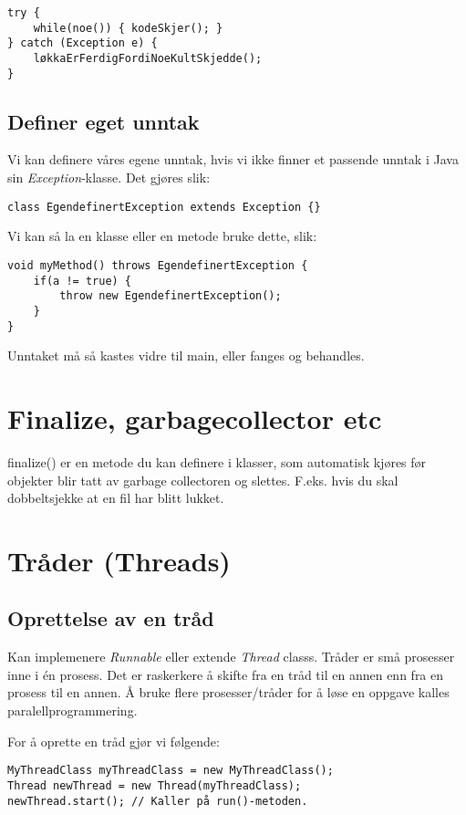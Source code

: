 \documentclass[11pt]{article}
\begin{document}
\begin{verbatim}
try { 
    while(noe()) { kodeSkjer(); }
} catch (Exception e) {
    løkkaErFerdigFordiNoeKultSkjedde();
}
\end{verbatim}
\subsection{Definer eget unntak}
\label{sec-16-3}

Vi kan definere våres egene unntak, hvis vi ikke finner et passende
unntak i Java sin \emph{Exception}-klasse. Det gjøres slik:


\begin{verbatim}
class EgendefinertException extends Exception {}
\end{verbatim}

Vi kan så la en klasse eller en metode bruke dette, slik:


\begin{verbatim}
void myMethod() throws EgendefinertException {
    if(a != true) {
        throw new EgendefinertException();
    }
}
\end{verbatim}

Unntaket må så kastes vidre til main, eller fanges og behandles. 
\section{Finalize, garbagecollector etc}
\label{sec-17}

finalize() er en metode du kan definere i klasser, som automatisk
kjøres før objekter blir tatt av garbage collectoren og
slettes. F.eks. hvis du skal dobbeltsjekke at en fil har blitt lukket.
\section{Tråder (Threads)}
\label{sec-18}
\subsection{Oprettelse av en tråd}
\label{sec-18-1}

Kan implemenere \emph{Runnable} eller extende \emph{Thread} classs.
Tråder er små prosesser inne i én prosess. Det er raskerkere å 
skifte fra en tråd til en annen enn fra en prosess til en annen.
Å bruke flere prosesser/tråder for å løse en oppgave kalles
paralellprogrammering.

For å oprette en tråd gjør vi følgende:


\begin{verbatim}
MyThreadClass myThreadClass = new MyThreadClass();
Thread newThread = new Thread(myThreadClass);
newThread.start(); // Kaller på run()-metoden.
\end{verbatim}
\end{document}
